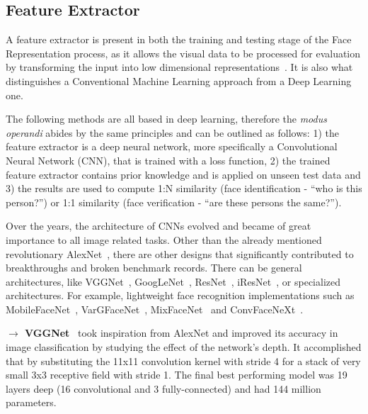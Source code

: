 \documentclass[class=report, crop=false, a4paper, 12pt]{standalone}
\begin{document}
\subsection{Feature Extractor}
A feature extractor is present in both the training and testing stage of the Face Representation process, as it allows the visual data to be processed for evaluation by transforming the input into low dimensional representations~\autocite{lecunGradientBasedLearningApplied1998}. It is also what distinguishes a Conventional Machine Learning approach from a Deep Learning one.  
\par The following methods are all based in deep learning, therefore the \textit{modus operandi} abides by the same principles and can be outlined as follows: 1) the feature extractor is a deep neural network, more specifically a Convolutional Neural Network (CNN), that is trained with a loss function, 2) the trained feature extractor contains prior knowledge and is applied on unseen test data and 3) the results are used to compute 1:N similarity (face identification - ``who is this person?'') or 1:1 similarity (face verification - ``are these persons the same?'').
\par Over the years, the architecture of CNNs evolved and became of great importance to all image related tasks. Other than the already mentioned revolutionary AlexNet~\autocite{krizhevskyImageNetClassificationDeep2012}, there are other designs that significantly contributed to breakthroughs and broken benchmark records. There can be general architectures, like VGGNet~\autocite{simonyanVERYDEEPCONVOLUTIONAL2015}, GoogLeNet~\autocite{szegedyGoingDeeperConvolutions2014}, ResNet~\autocite{heDeepResidualLearning2016}, iResNet~\autocite{dutaImprovedResidualNetworks2021}, or specialized architectures. For example, lightweight face recognition implementations such as MobileFaceNet~\autocite{chenMobileFaceNetsEfficientCNNs2018}, VarGFaceNet~\autocite{yanVarGFaceNetEfficientVariable2019}, MixFaceNet~\autocite{boutrosMixFaceNetsExtremelyEfficient2021} and ConvFaceNeXt~\autocite{hooConvFaceNeXtLightweightNetworks2022}.

\vspace{\baselineskip}
\noindent\textbf{$\rightarrow$ VGGNet}~\autocite{simonyanVERYDEEPCONVOLUTIONAL2015} took inspiration from AlexNet and improved its accuracy in image classification by studying the effect of the network's depth. It accomplished that by substituting the 11x11 convolution kernel with stride 4 for a stack of very small 3x3 receptive field with stride 1. The final best performing model was 19 layers deep (16 convolutional and 3 fully-connected) and had 144 million parameters.
\end{document}
